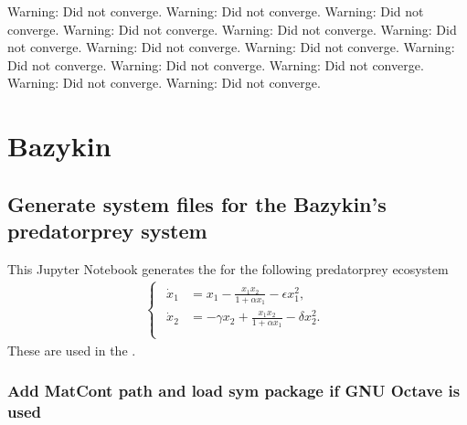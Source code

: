 \documentclass[letterpaper,10pt,english]{jupyterBook}
\begin{document}
\begin{sphinxVerbatim}[commandchars=\\\{\}]
Warning: Did not converge.
Warning: Did not converge.
Warning: Did not converge.
Warning: Did not converge.
Warning: Did not converge.
Warning: Did not converge.
Warning: Did not converge.
Warning: Did not converge.
Warning: Did not converge.
Warning: Did not converge.
Warning: Did not converge.
Warning: Did not converge.
Warning: Did not converge.
\end{sphinxVerbatim}

\noindent{}


\part{Bazykin}


\chapter{Generate system files for the Bazykin’s predator\sphinxhyphen{}prey system}
\label{\detokenize{BazykinGenSym:generate-system-files-for-the-bazykin-s-predator-prey-system}}\label{\detokenize{BazykinGenSym::doc}}
\sphinxAtStartPar
This Jupyter Notebook generates the  for the following predator\sphinxhyphen{}prey
ecosystem
\begin{equation*}
\begin{split}
\begin{cases}
\begin{aligned}
\dot x_1 &= x_1 - \frac{x_1 x_2}{1+\alpha x_1} - \epsilon x_1^2, \\
\dot x_2 &= -\gamma x_2 + \frac{x_1 x_2}{1+\alpha x_1} - \delta x_2^2. \\
\end{aligned}
\end{cases}
\end{split}
\end{equation*}
\sphinxAtStartPar
These are used in the {\hyperref[\detokenize{Bazykin::doc}]{}}.


\section{Add MatCont path and load sym package if GNU Octave is used}
\label{\detokenize{BazykinGenSym:add-matcont-path-and-load-sym-package-if-gnu-octave-is-used}}
\begin{sphinxVerbatim}[commandchars=\\\{\}]
\PYG{p}{[}\PYG{p}{]}
\end{sphinxVerbatim}
\end{document}
